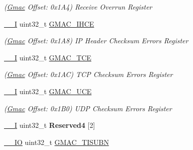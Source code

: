 \begin{DoxyCompactItemize}
\begin{DoxyCompactList}\small\item\em (\mbox{\hyperlink{structGmac}{Gmac}} Offset\+: 0x1\+A4) Receive Overrun Register \end{DoxyCompactList}\item 
\mbox{\label{structGmac_a504ac684dc0d74ffd0117738dd5d2e6f}} 
\mbox{\hyperlink{core__cm7_8h_af63697ed9952cc71e1225efe205f6cd3}{\+\_\+\+\_\+I}} uint32\+\_\+t \mbox{\hyperlink{structGmac_a504ac684dc0d74ffd0117738dd5d2e6f}{G\+M\+A\+C\+\_\+\+I\+H\+CE}}
\begin{DoxyCompactList}\small\item\em (\mbox{\hyperlink{structGmac}{Gmac}} Offset\+: 0x1\+A8) IP Header Checksum Errors Register \end{DoxyCompactList}\item 
\mbox{\label{structGmac_a7a9e29a47d9b6f65481be54808baf2bf}} 
\mbox{\hyperlink{core__cm7_8h_af63697ed9952cc71e1225efe205f6cd3}{\+\_\+\+\_\+I}} uint32\+\_\+t \mbox{\hyperlink{structGmac_a7a9e29a47d9b6f65481be54808baf2bf}{G\+M\+A\+C\+\_\+\+T\+CE}}
\begin{DoxyCompactList}\small\item\em (\mbox{\hyperlink{structGmac}{Gmac}} Offset\+: 0x1\+AC) T\+CP Checksum Errors Register \end{DoxyCompactList}\item 
\mbox{\label{structGmac_ae4e72f7c4058e12076141a51b57998c1}} 
\mbox{\hyperlink{core__cm7_8h_af63697ed9952cc71e1225efe205f6cd3}{\+\_\+\+\_\+I}} uint32\+\_\+t \mbox{\hyperlink{structGmac_ae4e72f7c4058e12076141a51b57998c1}{G\+M\+A\+C\+\_\+\+U\+CE}}
\begin{DoxyCompactList}\small\item\em (\mbox{\hyperlink{structGmac}{Gmac}} Offset\+: 0x1\+B0) U\+DP Checksum Errors Register \end{DoxyCompactList}\item 
\mbox{\label{structGmac_a7dc79ae0a33bd57553ccb6e64607ef0f}} 
\mbox{\hyperlink{core__cm7_8h_af63697ed9952cc71e1225efe205f6cd3}{\+\_\+\+\_\+I}} uint32\+\_\+t {\bfseries Reserved4} \mbox{[}2\mbox{]}
\item 
\mbox{\label{structGmac_a89a3f1b368e5789c9c9455c726c1ee68}} 
\mbox{\hyperlink{core__cm7_8h_aec43007d9998a0a0e01faede4133d6be}{\+\_\+\+\_\+\+IO}} uint32\+\_\+t \mbox{\hyperlink{structGmac_a89a3f1b368e5789c9c9455c726c1ee68}{G\+M\+A\+C\+\_\+\+T\+I\+S\+U\+BN}}

\end{DoxyCompactItemize}

